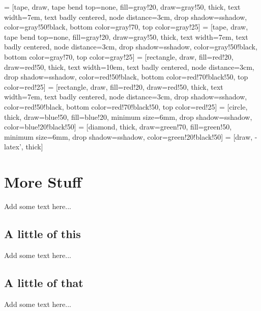 

 = [tape, draw, tape bend top=none, fill=gray!20, draw=gray!50, thick, 
    text width=7em, text badly centered, node distance=3cm, drop shadow={sshadow, color=gray!50!black},
    bottom color=gray!70, top color=gray!25]
 = [tape, draw, tape bend top=none, fill=gray!20, draw=gray!50, thick,
    text width=7em, text badly centered, node distance=3cm, drop shadow={sshadow, color=gray!50!black},
    bottom color=gray!70, top color=gray!25]
 = [rectangle, draw, fill=red!20, draw=red!50, thick,
    text width=10em, text badly centered, node distance=3cm, drop shadow={sshadow, color=red!50!black},
    bottom color=red!70!black!50, top color=red!25]
 = [rectangle, draw, fill=red!20, draw=red!50, thick,
    text width=7em, text badly centered, node distance=3cm, drop shadow={sshadow, color=red!50!black},
    bottom color=red!70!black!50, top color=red!25]
 = [circle, thick, draw=blue!50, fill=blue!20, minimum size=6mm,
    drop shadow={sshadow, color=blue!20!black!50}]
 = [diamond, thick, draw=green!70, fill=green!50, minimum size=6mm,
    drop shadow={sshadow, color=green!20!black!50}]
 = [draw, -latex', thick]

\chapter{More Stuff}
\label{sec:moar}
Add some text here...
\section{A little of this}
Add some text here...
\section{A little of that}
Add some text here...
